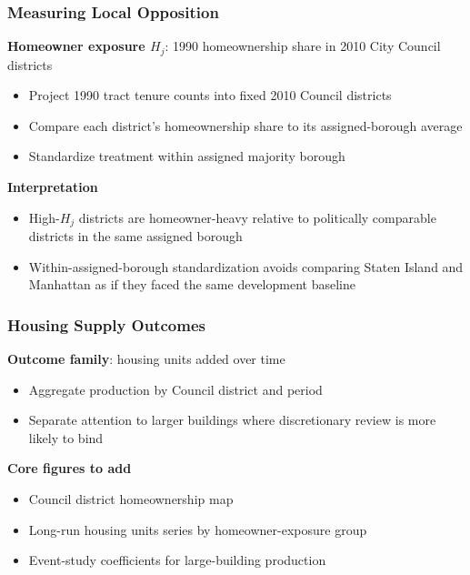 
\begin{frame}
    \frametitle{Measuring Local Opposition}

    \textbf{Homeowner exposure \(H_j\)}: 1990 homeownership share in 2010 City Council districts
    \begin{itemize}
        \item Project 1990 tract tenure counts into fixed 2010 Council districts
        \item Compare each district's homeownership share to its assigned-borough average
        \item Standardize treatment within assigned majority borough
    \end{itemize}

    \vspace{0.5em}
    \textbf{Interpretation}
    \begin{itemize}
        \item High-\(H_j\) districts are homeowner-heavy relative to politically comparable districts in the same assigned borough
        \item Within-assigned-borough standardization avoids comparing Staten Island and Manhattan as if they faced the same development baseline
    \end{itemize}
\end{frame}

\begin{frame}
    \frametitle{Housing Supply Outcomes}

    \textbf{Outcome family}: housing units added over time
    \begin{itemize}
        \item Aggregate production by Council district and period
        \item Separate attention to larger buildings where discretionary review is more likely to bind
    \end{itemize}

    \vspace{0.5em}
    \textbf{Core figures to add}
    \begin{itemize}
        \item Council district homeownership map
        \item Long-run housing units series by homeowner-exposure group
        \item Event-study coefficients for large-building production
    \end{itemize}
\end{frame}
